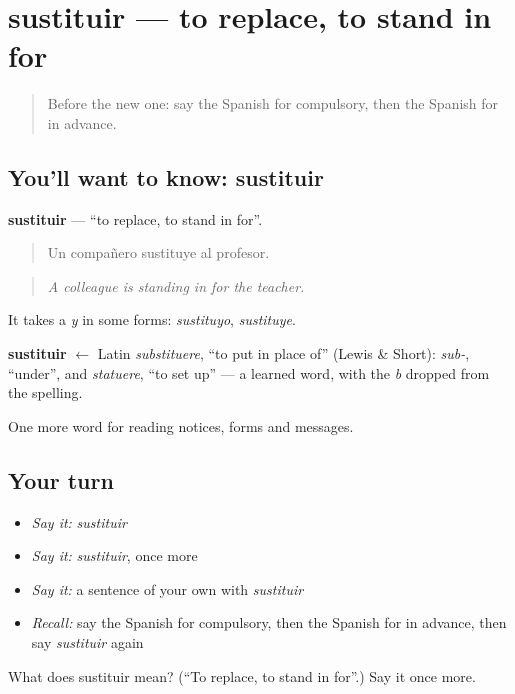 \section[sustituir]{sustituir — to replace, to stand in for}

\label{lesson:ES-C479-sustituir}



\begin{quote}
Before the new one: say the Spanish for compulsory, then the Spanish for in advance.
\end{quote}

\subsection*{You'll want to know: sustituir}
\textbf{sustituir} — \textquotedblleft{}to replace, to stand in for\textquotedblright{}.

\begin{quote}
Un compañero sustituye al profesor.
\end{quote}

\begin{quote}
\emph{A colleague is standing in for the teacher.}
\end{quote}

It takes a \emph{y} in some forms: \emph{sustituyo}, \emph{sustituye}.

\begin{cousinweb}
\textbf{sustituir} $\leftarrow$ Latin \emph{substituere}, \textquotedblleft{}to put in place of\textquotedblright{} (Lewis \& Short): \emph{sub-}, \textquotedblleft{}under\textquotedblright{}, and \emph{statuere}, \textquotedblleft{}to set up\textquotedblright{} — a learned word, with the \emph{b} dropped from the spelling.
\end{cousinweb}

\begin{grammarlens}[title={What you've built}]
One more word for reading notices, forms and messages.
\end{grammarlens}

\subsection*{Your turn}
\begin{itemize}
\raggedright
  \item \emph{Say it:} \emph{sustituir}
  \item \emph{Say it:} \emph{sustituir}, once more
  \item \emph{Say it:} a sentence of your own with \emph{sustituir}
  \item \emph{Recall:} say the Spanish for compulsory, then the Spanish for in advance, then say \emph{sustituir} again
\end{itemize}

\begin{tcolorbox}[breakable,colback=teal!4,colframe=teal!35!black,title={Before you move on}]
What does sustituir mean? (\textquotedblleft{}To replace, to stand in for\textquotedblright{}.) Say it once more.
\end{tcolorbox}
